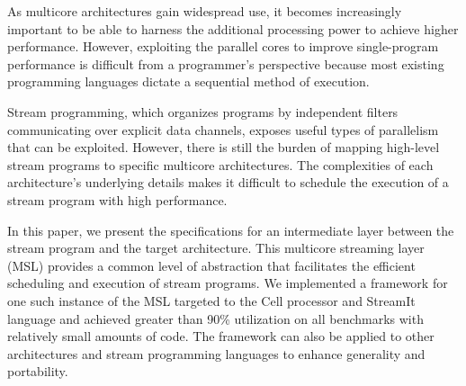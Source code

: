 %
%
%
%
%
%
%
% 
% 
%

As multicore architectures gain widespread use, it becomes increasingly important to be able to harness the
additional processing power to achieve higher performance. However, exploiting the parallel cores to
improve single-program performance is difficult from a
programmer's perspective because most existing programming languages dictate a sequential method of execution.

Stream programming, which organizes programs by independent filters communicating over explicit data channels, 
exposes useful types of parallelism that can be exploited. However, there is still the burden of mapping high-level stream programs to
specific multicore architectures. The complexities of each architecture's underlying details makes it difficult to
schedule the execution of a stream program with high performance.

In this paper, we present the specifications for an intermediate layer between the stream program and the target architecture.
This multicore streaming layer (MSL) provides a common level of abstraction that facilitates the efficient scheduling and
execution of stream programs. We implemented a framework for one such instance of the MSL targeted to the Cell processor and StreamIt language
and achieved greater than
90\% utilization on all benchmarks with relatively small amounts of code. The framework can also be applied to other
architectures and stream programming languages to enhance generality and portability.



